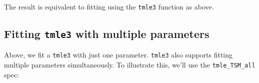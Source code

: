 \documentclass[12pt, krantz2,]{krantz}
\newenvironment{Shaded}{\begin{snugshade}}{\end{snugshade}}
\newcommand{\DecValTok}[1]{\textcolor[rgb]{0.06,0.06,0.06}{#1}}
\newcommand{\FloatTok}[1]{\textcolor[rgb]{0.06,0.06,0.06}{#1}}
\newcommand{\KeywordTok}[1]{\textcolor[rgb]{0.27,0.27,0.27}{\textbf{#1}}}
\newcommand{\NormalTok}[1]{#1}
\newcommand{\OperatorTok}[1]{\textcolor[rgb]{0.43,0.43,0.43}{\textbf{#1}}}
\newcommand{\StringTok}[1]{\textcolor[rgb]{0.5,0.5,0.5}{#1}}
\theoremstyle{definition}
\theoremstyle{definition}
\theoremstyle{definition}
\newcommand{\1}{\mathbbm{1}}
\begin{document}
\begin{Shaded}
\end{Shaded}

The result is equivalent to fitting using the \texttt{tmle3} function as above.

\hypertarget{fitting-tmle3-with-multiple-parameters}{%
\subsection{\texorpdfstring{Fitting \texttt{tmle3} with multiple parameters}{Fitting tmle3 with multiple parameters}}\label{fitting-tmle3-with-multiple-parameters}}

Above, we fit a \texttt{tmle3} with just one parameter. \texttt{tmle3} also supports fitting
multiple parameters simultaneously. To illustrate this, we'll use the
\texttt{tmle\_TSM\_all} spec:
\end{document}
